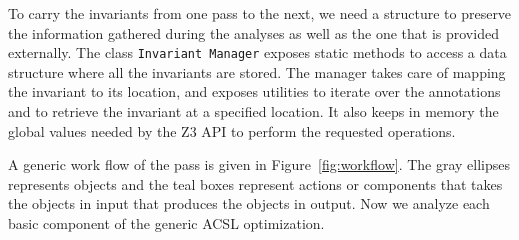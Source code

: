 To carry the invariants from one pass to the next, we need a structure to preserve the information gathered during the analyses as well as the one that is provided externally. The class \texttt{Invariant Manager} exposes static methods to access a data structure where all the invariants are stored. The manager takes care of mapping the invariant to its location, and exposes utilities to iterate over the annotations and to retrieve the invariant at a specified location. It also keeps in memory the global values needed by the Z3 API to perform the requested operations.

A generic work flow of the pass is given in Figure~\ref{fig:workflow}. The gray ellipses represents objects and the teal boxes represent actions or components that takes the objects in input that produces the objects in output. Now we analyze each basic component of the generic ACSL optimization.

